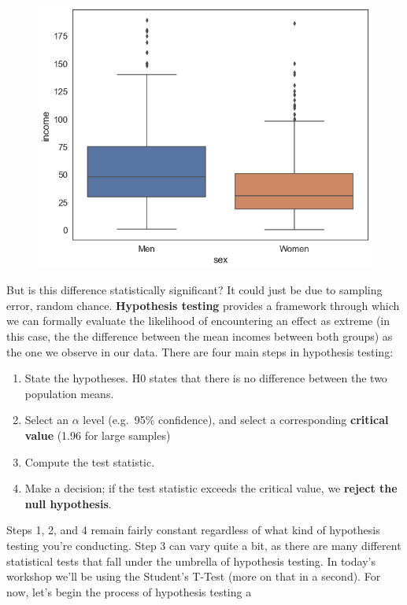 \documentclass[
  letterpaper,
  DIV=11,
  numbers=noendperiod]{scrreprt}
\providecommand{\tightlist}{%
  \setlength{\itemsep}{0pt}\setlength{\parskip}{0pt}}\usepackage{longtable,booktabs,array}
\begin{document}
\begin{figure}[H]

{\centering \includegraphics{notebooks/W07. Distributions and Basic Statistics_files/figure-pdf/cell-35-output-2.png}

}

\end{figure}

But is this difference statistically significant? It could just be due
to sampling error, random chance. \textbf{Hypothesis testing} provides a
framework through which we can formally evaluate the likelihood of
encountering an effect as extreme (in this case, the the difference
between the mean incomes between both groups) as the one we observe in
our data. There are four main steps in hypothesis testing:

\begin{enumerate}
\def\labelenumi{\arabic{enumi}.}
\tightlist
\item
  State the hypotheses. H0 states that there is no difference between
  the two population means.
\item
  Select an \(\alpha\) level (e.g.~95\% confidence), and select a
  corresponding \textbf{critical value} (1.96 for large samples)
\item
  Compute the test statistic.
\item
  Make a decision; if the test statistic exceeds the critical value, we
  \textbf{reject the null hypothesis}.
\end{enumerate}

Steps 1, 2, and 4 remain fairly constant regardless of what kind of
hypothesis testing you're conducting. Step 3 can vary quite a bit, as
there are many different statistical tests that fall under the umbrella
of hypothesis testing. In today's workshop we'll be using the Student's
T-Test (more on that in a second). For now, let's begin the process of
hypothesis testing a
\end{document}
